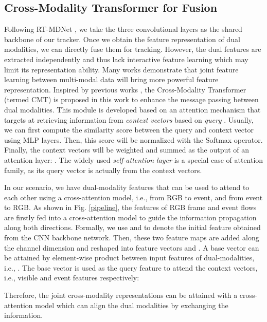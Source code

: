 \documentclass[journal]{IEEEtran}
\begin{document}
\subsection{Cross-Modality Transformer for Fusion}   \label{CMT}
Following RT-MDNet \cite{Jung_2018_ECCV}, we take the three convolutional layers as the shared backbone of our tracker. Once we obtain the feature representation of dual modalities, we can directly fuse them for tracking. However, the dual features are extracted independently and thus lack interactive feature learning which may limit its representation ability. Many works demonstrate that joint feature learning between multi-modal data will bring more powerful feature representation. Inspired by previous works \cite{vaswani2017attention, tan2019lxmert}, the Cross-Modality Transformer (termed CMT) is proposed in this work to enhance the message passing between dual modalities. This module is developed based on an attention mechanism that targets at retrieving information from \emph{context vectors}  based on \emph{query} . Usually, we can first compute the similarity score  between the query  and context vector  using MLP layers. Then, this score will be normalized with the Softmax operator. Finally, the context vectors will be weighted and summed as the output of an attention layer: . The widely used \emph{self-attention layer} \cite{wang2018nonlocal} is a special case of attention family, as its query vector  is actually from the context vectors. 





In our scenario, we have dual-modality features that can be used to attend to each other using a cross-attention model, i.e., from RGB to event, and from event to RGB. As shown in Fig. \ref{pipeline}, the features of RGB frame and event flows are firstly fed into a cross-attention model to guide the information propagation along both directions. Formally, we use  and  to denote the initial feature obtained from the CNN backbone network. Then, these two feature maps are added along the channel dimension and reshaped into feature vectors  and . A base vector  can be attained by element-wise product between input features of dual-modalities, i.e., . The base vector  is used as the query feature to attend the context vectors, i.e., visible and event features respectively: 

Therefore, the joint cross-modality representations can be attained with a cross-attention model which can align the dual modalities by exchanging the information. 
\end{document}
